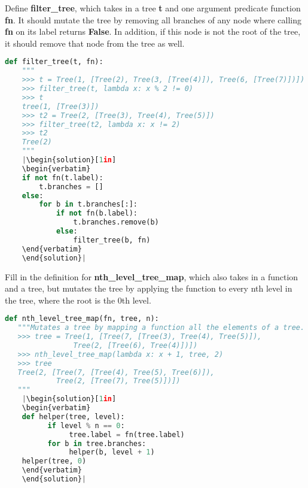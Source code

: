 \question
Define \textbf{filter\_tree}, which takes in a tree \textbf{t} and one argument predicate function \textbf{fn}. It should mutate the tree by removing all branches of any node where calling \textbf{fn} on its label returns \textbf{False}. In addition, if this node is not the root of the tree, it should remove that node from the tree as well.

\begin{lstlisting}[language=Python]
def filter_tree(t, fn):
    """
    >>> t = Tree(1, [Tree(2), Tree(3, [Tree(4)]), Tree(6, [Tree(7)])])
    >>> filter_tree(t, lambda x: x % 2 != 0)
    >>> t
    tree(1, [Tree(3)])
    >>> t2 = Tree(2, [Tree(3), Tree(4), Tree(5)])
    >>> filter_tree(t2, lambda x: x != 2)
    >>> t2
    Tree(2)
    """
    |\begin{solution}[1in]
    \begin{verbatim}
    if not fn(t.label):
        t.branches = []
    else:
        for b in t.branches[:]:
            if not fn(b.label): 
                t.branches.remove(b)
            else: 
                filter_tree(b, fn)
    \end{verbatim}
    \end{solution}|
\end{lstlisting}

\question
Fill in the definition for \textbf{nth\_level\_tree\_map}, which also takes in a function and a tree, but mutates the tree by applying the function to every nth level in the tree, where the root is the 0th level.

\begin{lstlisting}[language=Python]
def nth_level_tree_map(fn, tree, n):
   """Mutates a tree by mapping a function all the elements of a tree.
   >>> tree = Tree(1, [Tree(7, [Tree(3), Tree(4), Tree(5)]),
                Tree(2, [Tree(6), Tree(4)])])
   >>> nth_level_tree_map(lambda x: x + 1, tree, 2)
   >>> tree
   Tree(2, [Tree(7, [Tree(4), Tree(5), Tree(6)]), 
            Tree(2, [Tree(7), Tree(5)])])
   """
    |\begin{solution}[1in]
    \begin{verbatim}
    def helper(tree, level):
          if level % n == 0:
               tree.label = fn(tree.label)
          for b in tree.branches:
               helper(b, level + 1)
  	helper(tree, 0)
    \end{verbatim}
    \end{solution}|
\end{lstlisting}
